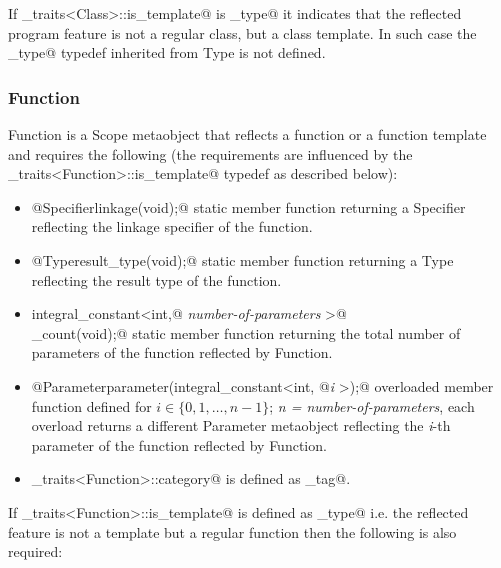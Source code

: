 If \verb@metaobject_traits<Class>::is_template@ is \verb@true_type@ it indicates 
that the reflected program feature is not a regular class, but a class template.
In such case the \verb@original_type@ typedef inherited from {\metaobject Type}
is not defined.

\subsubsection{Function}

{\metaobject Function} is a {\metaobject Scope} metaobject that reflects a function
or a function template and requires the following (the requirements are influenced
by the \verb@metaobject_traits<Function>::is_template@ typedef as described below):

\begin{itemize}
	\item{\verb@static @{\metaobject Specifier}\verb@ linkage(void);@} static member function returning
	a {\metaobject Specifier} reflecting the linkage specifier of the function.

	\item{\verb@static @{\metaobject Type}\verb@ result_type(void);@} static member function returning
	a {\metaobject Type} reflecting the result type of the function.

	\item{\verb@static integral_constant<int,@ {\em number-of-parameters}
	\verb@>@\\\verb@parameter_count(void);@} static member function returning the total number
	of parameters of the function reflected by {\metaobject Function}.

	\item{\verb@static @{\metaobject Parameter}\verb@ parameter(integral_constant<int, @{\em i}
	\verb@>);@} overloaded member function defined
	for $i \in \{0, 1, \dots, n-1\}$; {\em n = number-of-parameters},
	each overload returns a different {\metaobject Parameter} metaobject reflecting the {\em i}-th parameter
	of the function reflected by {\metaobject Function}.

	\item \verb@metaobject_traits<Function>::category@ is defined as \verb@function_tag@.
\end{itemize}

If \verb@metaobject_traits<Function>::is_template@ is defined as \verb@false_type@
i.e. the reflected feature is not a template but a regular function then the following is also
required:

